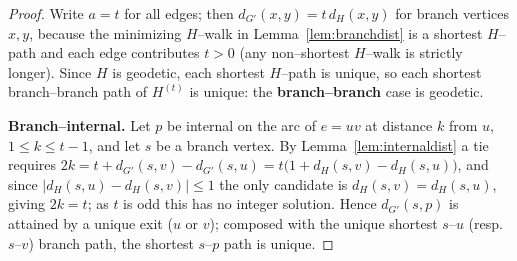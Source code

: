 \documentclass{amsart}
\theoremstyle{plain}
\theoremstyle{definition}
\newcommand{\dG}{d_{G'}}
\newcommand{\dH}{d_{H}}
\begin{document}
\begin{proof}
Write $a=t$ for all edges; then $\dG(x,y)=t\,\dH(x,y)$ for branch vertices $x,y$,
because the minimizing $H$--walk in Lemma~\ref{lem:branchdist} is a shortest
$H$--path and each edge contributes $t>0$ (any non--shortest $H$--walk is strictly
longer). Since $H$ is geodetic, each shortest $H$--path is unique, so each shortest
branch--branch path of $H^{(t)}$ is unique: the \textbf{branch--branch} case is
geodetic.

\textbf{Branch--internal.} Let $p$ be internal on the arc of $e=uv$ at distance $k$
from $u$, $1\le k\le t-1$, and let $s$ be a branch vertex. By
Lemma~\ref{lem:internaldist} a tie requires $2k=t+\dG(s,v)-\dG(s,u)=t\bigl(1+
\dH(s,v)-\dH(s,u)\bigr)$, and since $|\dH(s,u)-\dH(s,v)|\le1$ the only candidate is
$\dH(s,v)=\dH(s,u)$, giving $2k=t$; as $t$ is odd this has no integer solution.
Hence $\dG(s,p)$ is attained by a unique exit ($u$ or $v$); composed with the unique
shortest $s$--$u$ (resp.\ $s$--$v$) branch path, the shortest $s$--$p$ path is
unique.


\end{proof}
\end{document}
